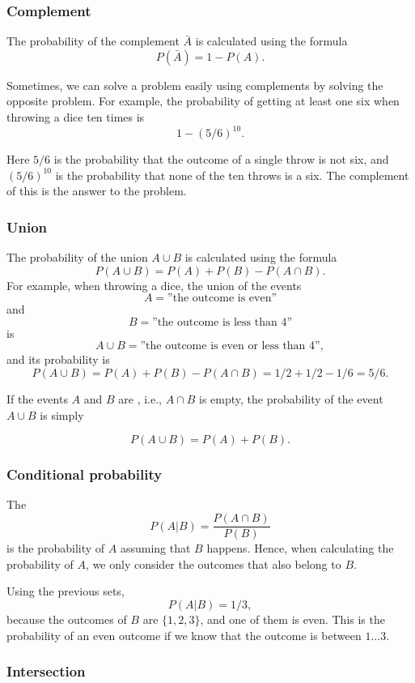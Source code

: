 \subsubsection{Complement}

The probability of the complement
$\bar A$ is calculated using the formula
\[P(\bar A)=1-P(A).\]

Sometimes, we can solve a problem easily
using complements by solving the opposite problem.
For example, the probability of getting
at least one six when throwing a dice ten times is
\[1-(5/6)^{10}.\]

Here $5/6$ is the probability that the outcome
of a single throw is not six, and
$(5/6)^{10}$ is the probability that none of
the ten throws is a six.
The complement of this is the answer to the problem.

\subsubsection{Union}

The probability of the union $A \cup B$
is calculated using the formula
\[P(A \cup B)=P(A)+P(B)-P(A \cap B).\]
For example, when throwing a dice,
the union of the events
\[A=\textrm{''the outcome is even''}\]
and
\[B=\textrm{''the outcome is less than 4''}\]
is
\[A \cup B=\textrm{''the outcome is even or less than 4''},\]
and its probability is
\[P(A \cup B) = P(A)+P(B)-P(A \cap B)=1/2+1/2-1/6=5/6.\]

If the events $A$ and $B$ are , i.e.,
$A \cap B$ is empty,
the probability of the event $A \cup B$ is simply

\[P(A \cup B)=P(A)+P(B).\]

\subsubsection{Conditional probability}


The 
\[P(A | B) = \frac{P(A \cap B)}{P(B)}\]
is the probability of $A$
assuming that $B$ happens.
Hence, when calculating the
probability of $A$, we only consider the outcomes
that also belong to $B$.

Using the previous sets,
\[P(A | B)= 1/3,\]
because the outcomes of $B$ are
$\{1,2,3\}$, and one of them is even.
This is the probability of an even outcome
if we know that the outcome is between $1 \ldots 3$.

\subsubsection{Intersection}

